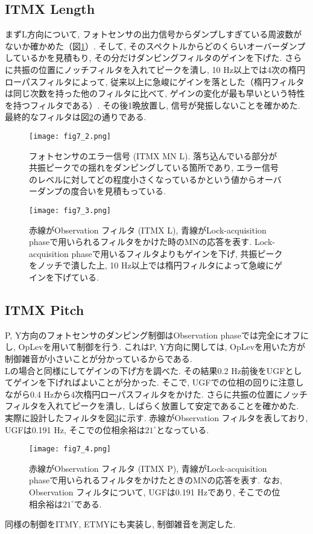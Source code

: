 \subsection{ITMX Length}
まずL方向について, フォトセンサの出力信号からダンプしすぎている周波数がないか確かめた（図\ref{fig7.2}）. そして, そのスペクトルからどのくらいオーバーダンプしているかを見積もり, その分だけダンピングフィルタのゲインを下げた. さらに共振の位置にノッチフィルタを入れてピークを潰し, 10 Hz以上では4次の楕円ローパスフィルタによって, 従来以上に急峻にゲインを落とした（楕円フィルタは同じ次数を持った他のフィルタに比べて, ゲインの変化が最も早いという特性を持つフィルタである）. その後1晩放置し, 信号が発振しないことを確かめた. 最終的なフィルタは図\ref{fig7.3}の通りである.
\begin{figure}[H]
\begin{center}
\texttt{[image: fig7\_2.png]}
\caption[フォトセンサのエラー信号 (ITMX MN L)]{フォトセンサのエラー信号 (ITMX MN L). 落ち込んでいる部分が共振ピークでの揺れをダンピングしている箇所であり, エラー信号のレベルに対してどの程度小さくなっているかという値からオーバーダンプの度合いを見積もっている.}
\label{fig7.2}
\end{center}
\end{figure}
\begin{figure}[H]
\begin{center}
\texttt{[image: fig7\_3.png]}
\caption[Observation フィルタ (ITMX L)]{赤線がObservation フィルタ (ITMX L), 青線がLock-acquisition phaseで用いられるフィルタをかけた時のMNの応答を表す. Lock-acquisition phaseで用いるフィルタよりもゲインを下げ, 共振ピークをノッチで潰した上, 10 Hz以上では楕円フィルタによって急峻にゲインを下げている.}
\label{fig7.3}
\end{center}
\end{figure}
\subsection{ITMX Pitch}
P, Y方向のフォトセンサのダンピング制御はObservation phaseでは完全にオフにし, OpLevを用いて制御を行う. これはP, Y方向に関しては, OpLevを用いた方が制御雑音が小さいことが分かっているからである. \\
\quad Lの場合と同様にしてゲインの下げ方を調べた. その結果0.2 Hz前後をUGFとしてゲインを下げればよいことが分かった. そこで, UGFでの位相の回りに注意しながら0.4 Hzから4次楕円ローパスフィルタをかけた. さらに共振の位置にノッチフィルタを入れてピークを潰し, しばらく放置して安定であることを確かめた.\\
\quad 実際に設計したフィルタを図\ref{fig7.4}に示す. 赤線がObservation フィルタを表しており, UGFは0.191 Hz, そこでの位相余裕は$21^{\circ}$となっている.
\begin{figure}[H]
\begin{center}
\texttt{[image: fig7\_4.png]}
\caption[Observation フィルタ (ITMX P)]{赤線がObservation フィルタ (ITMX P), 青線がLock-acquisition phaseで用いられるフィルタをかけたときのMNの応答を表す. なお, Observation フィルタについて, UGFは0.191 Hzであり, そこでの位相余裕は$21^{\circ}$である.}
\label{fig7.4}
\end{center}
\end{figure}
同様の制御をITMY, ETMYにも実装し, 制御雑音を測定した.
